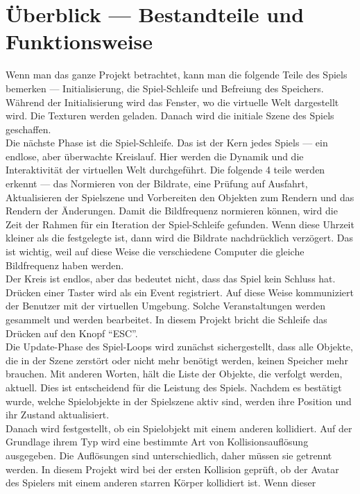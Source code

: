 \documentclass[
  10pt,
  a4paper,
  oneside,
  headers,
  headinclude,
  footinclude,
  BCOR5mm,
]{article}
\begin{document}
\section{Überblick --- Bestandteile und Funktionsweise}
Wenn man das ganze Projekt betrachtet, kann man die folgende Teile des Spiels
bemerken --- Initialisierung, die Spiel-Schleife und Befreiung des Speichers. \\
Während der Initialisierung wird das Fenster, wo die virtuelle Welt dargestellt
wird. Die Texturen werden geladen. Danach wird die initiale Szene des Spiels
geschaffen.\\
Die nächste Phase ist die Spiel-Schleife. Das ist der Kern jedes Spiels --- ein
endlose, aber überwachte Kreislauf. Hier werden die Dynamik und die
Interaktivität der virtuellen Welt durchgeführt. Die folgende 4 teile werden
erkennt --- das Normieren von der Bildrate, eine Prüfung auf Ausfahrt,
Aktualisieren der Spielszene und Vorbereiten den Objekten zum Rendern und das
Rendern der Änderungen. Damit die Bildfrequenz normieren können, wird die Zeit
der Rahmen für ein Iteration der Spiel-Schleife gefunden. Wenn diese Uhrzeit
kleiner als die festgelegte ist, dann wird die Bildrate nachdrücklich verzögert.
Das ist wichtig, weil auf diese Weise die verschiedene Computer die gleiche
Bildfrequenz haben werden.\\
Der Kreis ist endlos, aber das bedeutet nicht, dass das Spiel kein Schluss hat.
Drücken einer Taster wird als ein Event registriert. Auf diese Weise
kommuniziert der Benutzer mit der virtuellen Umgebung. Solche Veranstaltungen
werden gesammelt und werden bearbeitet. In diesem Projekt bricht die Schleife
das Drücken auf den Knopf ``ESC''.\\
Die Update-Phase des Spiel-Loops wird zunächst sichergestellt, dass alle
Objekte, die in der Szene zerstört oder nicht mehr benötigt werden, keinen
Speicher mehr brauchen. Mit anderen Worten, hält die Liste der Objekte, die
verfolgt werden, aktuell. Dies ist entscheidend für die Leistung des Spiels.
Nachdem es bestätigt wurde, welche Spielobjekte in der Spielszene aktiv sind,
werden ihre Position und ihr Zustand aktualisiert.\\
Danach wird festgestellt, ob ein Spielobjekt mit einem anderen kollidiert. Auf
der Grundlage ihrem Typ wird eine bestimmte Art von Kollisionsauflösung
ausgegeben. Die Auflösungen sind unterschiedlich, daher müssen sie getrennt
werden. In diesem Projekt wird bei der ersten Kollision geprüft, ob der Avatar
des Spielers mit einem anderen starren Körper kollidiert ist. Wenn dieser
\end{document}
